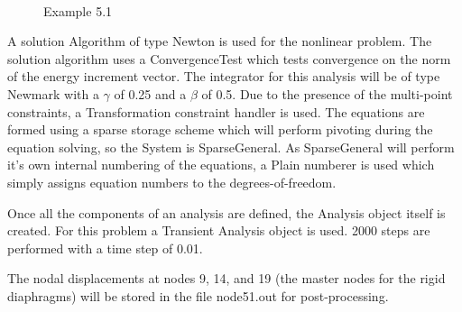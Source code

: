 \documentclass[12pt]{article}
\begin{document}
\begin{figure}[h]
\begin{center}
\leavevmode
\hbox{%
\epsfxsize=4.0in
}
\end{center}
\caption{Example 5.1}
\label{example5}
\end{figure}

\vspace{0.2in}

A solution Algorithm of type Newton is used for the nonlinear
problem. The solution algorithm uses a ConvergenceTest which tests
convergence on the norm of the energy increment vector. The
integrator for this analysis will be of type Newmark with a $\gamma$
of 0.25 and a $\beta$ of 0.5. Due to the presence of the multi-point
constraints, a Transformation constraint handler is used. The
equations are formed using a sparse storage scheme which will perform
pivoting during the equation solving, so the System is
SparseGeneral. As SparseGeneral will perform it's own internal
numbering of the equations, a Plain numberer is used which simply
assigns equation numbers to the degrees-of-freedom. 

Once all the components of an analysis are defined, the Analysis
object itself is created.  For this problem a Transient Analysis object
is used. 2000 steps are performed with a time step of 0.01.

\vspace{0.2in} 

The nodal displacements at nodes 9, 14, and 19
(the master nodes for the rigid diaphragms)
will be stored in the file node51.out for post-processing.
\end{document}
